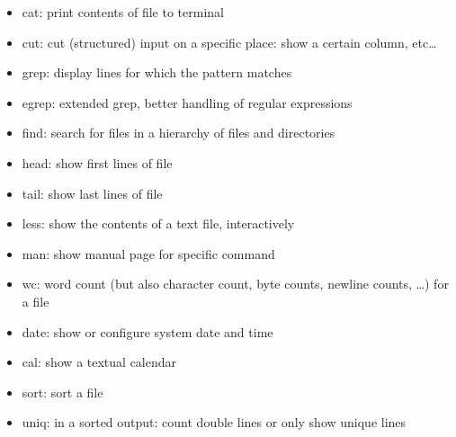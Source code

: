 \documentclass{article}
\begin{document}
\begin{itemize}
    \item cat: print contents of file to terminal
    \item cut: cut (structured) input on a specific place: show a certain column, etc\dots
    \item grep: display lines for which the pattern matches
    \item egrep: extended grep, better handling of regular expressions
    \item find: search for files in a hierarchy of files and directories
    \item head: show first lines of file
    \item tail: show last lines of file
    \item less: show the contents of a text file, interactively
    \item man: show manual page for specific command
    \item wc: word count (but also character count, byte counts, newline counts, \dots) for a file
    \item date: show or configure system date and time
    \item cal: show a textual calendar
    \item sort: sort a file
    \item uniq: in a sorted output: count double lines or only show unique lines
\end{itemize}
\end{document}
